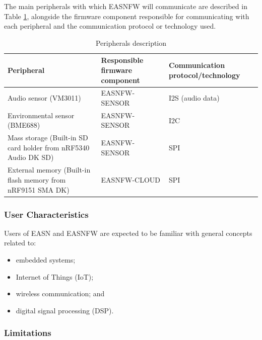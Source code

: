 \documentclass[11pt,a4paper]{article}
\begin{document}

The main peripherals with which EASNFW will communicate are described in Table
\ref{table:peripherals}, alongside the firmware component responsible for
communicating with each peripheral and the communication protocol or technology
used.

\begin{table}[h!]
\centering
\begin{tabular}{ m{4.5cm} m{3.5cm} m{6cm} }
    Peripheral                                                              & Responsible firmware component & Communication protocol/technology \\
    \hline
    Audio sensor (VM3011)                                                   & EASNFW-SENSOR                  & I2S (audio data) \\
    Environmental sensor (BME688)                                           & EASNFW-SENSOR                  & I2C \\
    Mass storage (Built-in SD card holder from nRF5340 Audio DK SD)         & EASNFW-SENSOR                  & SPI \\
    External memory (Built-in flash memory from nRF9151 SMA DK)             & EASNFW-CLOUD                   & SPI
\end{tabular}
\caption{Peripherals description}\label{table:peripherals}
\end{table}

\subsubsection{User Characteristics}

Users of EASN and EASNFW are expected to be familiar with general concepts
related to:

\begin{itemize}
    \item embedded systems;
    \item Internet of Things (IoT);
    \item wireless communication; and
    \item digital signal processing (DSP).
\end{itemize}

\subsubsection{Limitations}
\end{document}

